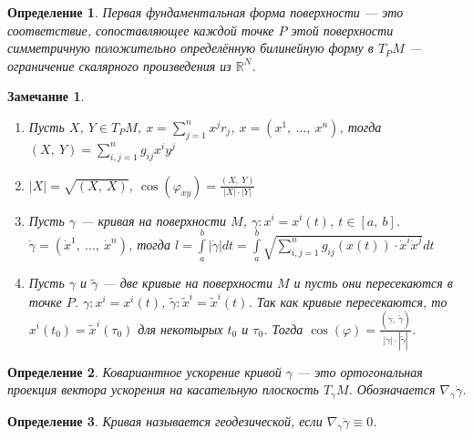 \documentclass[12pt]{article}
\newcommand\tab[1][.5cm]{\hspace*{#1}}
\theoremstyle{plain}
\newtheorem{definition}{Определение}[section]
\newtheorem{remark}{Замечание}
\newcommand{\R}{\mathbb R}
\renewcommand{\phi}{\varphi}
\begin{document}
    \begin{definition}
        Первая фундаментальная форма поверхности --- это соответствие, сопоставляющее каждой точке $P$ этой поверхности симметричную положительно определённую билинейную форму в $T_PM$ --- ограничение скалярного произведения из $\R^N$.
    \end{definition}
    \begin{remark}\tab
        \begin{enumerate}
            \item Пусть $X$, $Y\in T_PM$, $x=\sum\limits_{j=1}^nx^jr_j$, $x=(x^1, \ \ldots, \ x^n)$, тогда $(X, \ Y)=\sum\limits_{i,j=1}^{n}g_{ij}x^iy^j$
            \item $|X|=\sqrt{(X, \ X)}$, $\cos(\phi_{xy})=\frac{(X, \ Y)}{|X|\cdot|Y|}$
            \item Пусть $\gamma$ --- кривая на поверхности $M$, $\gamma :x^i=x^i(t)$, $t\in[a, \ b]$. $\dot{\gamma}=(\dot{x}^1, \ \ldots, \ \dot{x}^n)$, тогда $l=\int\limits_a^b|\dot{\gamma}|dt=\int\limits_a^b\sqrt{\sum\limits_{i,j=1}^{n}g_{ij}(x(t))\cdot\dot{x}^i\dot{x}^j}dt$
            \item Пусть $\gamma$ и $\tilde{\gamma}$ --- две кривые на поверхности $M$ и пусть они пересекаются в точке $P$. $\gamma: x^i=x^i(t)$, $\tilde{\gamma}:\tilde{x}^i=\tilde{x}^i(t)$. Так как кривые пересекаются, то $x^i(t_0)=\tilde{x}^i(\tau_0)$ для некотырых $t_0$ и $\tau_0$. Тогда $\cos(\phi)=\frac{(\dot{\gamma}, \ \dot{\tilde{\gamma}})}{|\dot{\gamma}|\cdot|\dot{\tilde{\gamma}}|}$.
        \end{enumerate}
    \end{remark}
    \begin{definition}
        Ковариантное ускорение кривой $\gamma$ --- это ортогональная проекция вектора ускорения на касательную плоскость $T_{\gamma}M$. Обозначается $\nabla_{\dot{\gamma}}\dot{\gamma}$.
    \end{definition}
    \begin{definition}
        Кривая называется геодезической, если $\nabla_{\dot{\gamma}}\dot{\gamma}\equiv0$.
    \end{definition}
\end{document}
